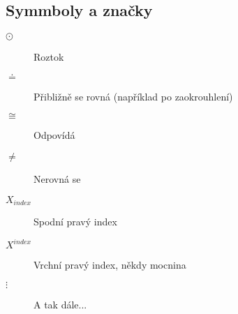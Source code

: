 \subsection{Symmboly a značky}

\begin{description}
    \item[$\odot $] Roztok
    \item[$\doteq $] Přibližně se rovná (například po zaokrouhlení)
    \item[$\cong $] Odpovídá
    \item[$\neq $] Nerovná se 
    \item[$X_{index}$] Spodní pravý index
    \item[$X^{index}$] Vrchní pravý index, někdy mocnina
    \item[$\vdots $] A tak dále... 
\end{description}